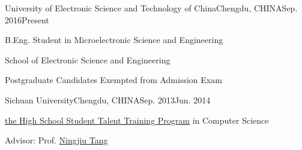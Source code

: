 
\begin{eduitem}{University of Electronic Science and Technology of China}{Chengdu, CHINA}{Sep. 2016}{Present}
\item B.Eng. Student in Microelectronic Science and Engineering
\item School of Electronic Science and Engineering
\item Postgraduate Candidates Exempted from Admission Exam
\end{eduitem}

\begin{eduitem}{Sichuan University}{Chengdu, CHINA}{Sep. 2013}{Jun. 2014}
\item \href{http://ycjh.org}{the High School Student Talent Training Program} in Computer Science 
\item Advisor: Prof. \href{http://cs.scu.edu.cn/info/1074/3930.htm}{Ningjiu Tang}
\end{eduitem}

\endinput